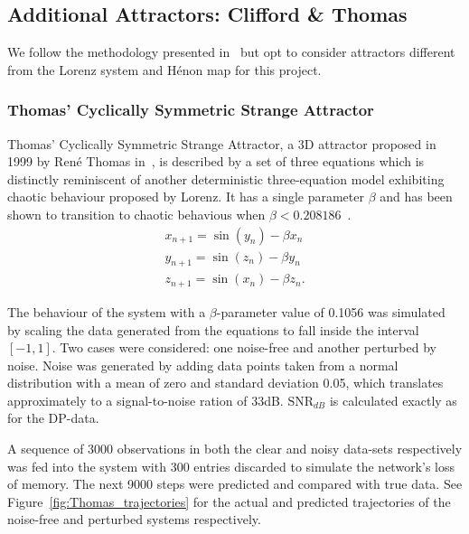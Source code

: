  

\subsection{Additional Attractors: Clifford \& Thomas}
We follow the methodology presented in~\cite{manjunath2021universal} but opt to consider attractors different from the Lorenz system and H\'enon map for this project.

\subsubsection{Thomas' Cyclically Symmetric Strange Attractor}\label{Thomas_Attractor}
Thomas' Cyclically Symmetric Strange Attractor, a 3D attractor proposed in 1999 by Ren\'e Thomas in~\cite{ThomasAttractor}, is described by a set of three equations which is distinctly reminiscent of another deterministic three-equation model exhibiting chaotic behaviour proposed by Lorenz. 
It has a single parameter $\beta$ and has been shown to transition to chaotic behavious when $\beta<0.208186$~\cite{Thomas_BetaParameter}.
\begin{eqnarray}\label{eqns_thomas}
  x_{n+1} = \sin(y_n) - \beta{x_n} \\
  y_{n+1} = \sin(z_n) - \beta{y_n} \\
  z_{n+1} = \sin(x_n) - \beta{z_n}.
\end{eqnarray}

The behaviour of the system with a $\beta$-parameter value of 0.1056 was simulated by scaling the data generated from the equations to fall inside the interval $[-1,1]$. Two cases were considered: one noise-free and another perturbed by noise. 
Noise was generated  by adding data points taken from a normal distribution with a mean of zero and standard deviation 0.05, which translates approximately to a signal-to-noise ration of 33dB. 
$\text{SNR}_{dB}$ is calculated exactly as for the DP-data.

A sequence of 3000 observations in both the clear and noisy data-sets respectively was fed into the system with 300 entries discarded to simulate the network's loss of memory. 
The next 9000 steps were predicted and compared with true data. See Figure~\ref{fig:Thomas_trajectories} for the actual and predicted trajectories of the noise-free and perturbed systems respectively. 

